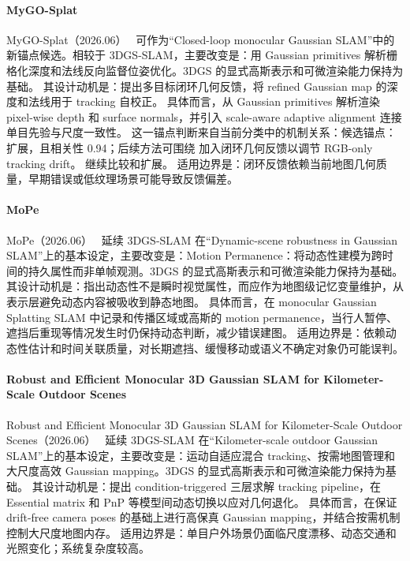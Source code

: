 \paragraph{MyGO-Splat}
MyGO-Splat（2026.06）~\cite{2606_29738} 可作为“Closed-loop monocular Gaussian SLAM”中的新锚点候选。相较于 3DGS-SLAM，主要改变是：用 Gaussian primitives 解析栅格化深度和法线反向监督位姿优化。3DGS 的显式高斯表示和可微渲染能力保持为基础。
其设计动机是：提出多目标闭环几何反馈，将 refined Gaussian map 的深度和法线用于 tracking 自校正。
具体而言，从 Gaussian primitives 解析渲染 pixel-wise depth 和 surface normals，并引入 scale-aware adaptive alignment 连接单目先验与尺度一致性。
这一锚点判断来自当前分类中的机制关系：候选锚点：扩展，且相关性 0.94；后续方法可围绕 加入闭环几何反馈以调节 RGB-only tracking drift。 继续比较和扩展。
适用边界是：闭环反馈依赖当前地图几何质量，早期错误或低纹理场景可能导致反馈偏差。

\paragraph{MoPe}
MoPe（2026.06）~\cite{2606_29237} 延续 3DGS-SLAM 在“Dynamic-scene robustness in Gaussian SLAM”上的基本设定，主要改变是：Motion Permanence：将动态性建模为跨时间的持久属性而非单帧观测。3DGS 的显式高斯表示和可微渲染能力保持为基础。
其设计动机是：指出动态性不是瞬时视觉属性，而应作为地图级记忆变量维护，从表示层避免动态内容被吸收到静态地图。
具体而言，在 monocular Gaussian Splatting SLAM 中记录和传播区域或高斯的 motion permanence，当行人暂停、遮挡后重现等情况发生时仍保持动态判断，减少错误建图。
适用边界是：依赖动态性估计和时间关联质量，对长期遮挡、缓慢移动或语义不确定对象仍可能误判。

\paragraph{Robust and Efficient Monocular 3D Gaussian SLAM for Kilometer-Scale Outdoor Scenes}
Robust and Efficient Monocular 3D Gaussian SLAM for Kilometer-Scale Outdoor Scenes（2026.06）~\cite{2606_30436} 延续 3DGS-SLAM 在“Kilometer-scale outdoor Gaussian SLAM”上的基本设定，主要改变是：运动自适应混合 tracking、按需地图管理和大尺度高效 Gaussian mapping。3DGS 的显式高斯表示和可微渲染能力保持为基础。
其设计动机是：提出 condition-triggered 三层求解 tracking pipeline，在 Essential matrix 和 PnP 等模型间动态切换以应对几何退化。
具体而言，在保证 drift-free camera poses 的基础上进行高保真 Gaussian mapping，并结合按需机制控制大尺度地图内存。
适用边界是：单目户外场景仍面临尺度漂移、动态交通和光照变化；系统复杂度较高。
